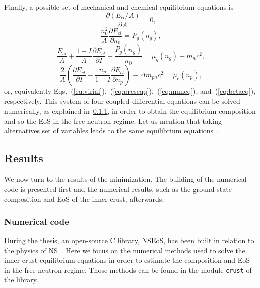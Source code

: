 Finally, a possible set of mechanical and chemical equilibrium equations is
%
\begin{equation}
  \frac{\partial (E_{cl}/A)}{\partial A} = 0,\label{eq:ic1}
\end{equation}
%
\begin{equation}
  \frac{n_0^2}{A}\frac{\partial E_{cl}}{\partial n_0} = P_g(n_g),\label{eq:ic2}
\end{equation}
%
\begin{equation}
  \frac{E_{cl}}{A} + \frac{1-I}{A}\frac{\partial E_{cl}}{\partial I} +
  \frac{P_g(n_g)}{n_0} = \mu_g(n_g) - m_nc^2,\label{eq:ic3}
\end{equation}
%
\begin{equation}
  \frac{2}{A}\left(\frac{\partial E_{cl}}{\partial I} -
  \frac{n_p}{1-I}\frac{\partial E_{cl}}{\partial n_p}\right) - \Delta
  m_{pn}c^2 = \mu_e(n_p),\label{eq:ic4}
\end{equation}
%
or, equivalently
Eqs.~(\ref{eq:virial}),~(\ref{eq:preseqq}),~(\ref{eq:muneq}), and~(\ref{eq:betaeq}), 
respectively.
This system of four coupled differential equations can be solved numerically, as
explained in~\ref{subsubsec:numcode}, in order to obtain the equilibrium
composition and so the EoS in the free neutron regime.
Let us mention that taking alternatives set of variables leads to the 
same equilibrium equations~\cite{Haensel2007,Vinas2017}.

\subsection{Results}\label{subsec:results_icrust}

We now turn to the results of the minimization. 
The building of the numerical code is presented first and the numerical results, 
such as the ground-state composition and EoS of the inner crust, afterwards.

\subsubsection{Numerical code}\label{subsubsec:numcode}

During the thesis, an open-source C library, NSEoS, has been built in relation 
to the physics of NS~\cite{NSEoS}. Here we focus 
on the numerical methods used to solve the inner crust equilibrium equations 
in order to estimate the composition and EoS in the free neutron regime. Those 
methods can be found in the module \verb|crust| of the library.

